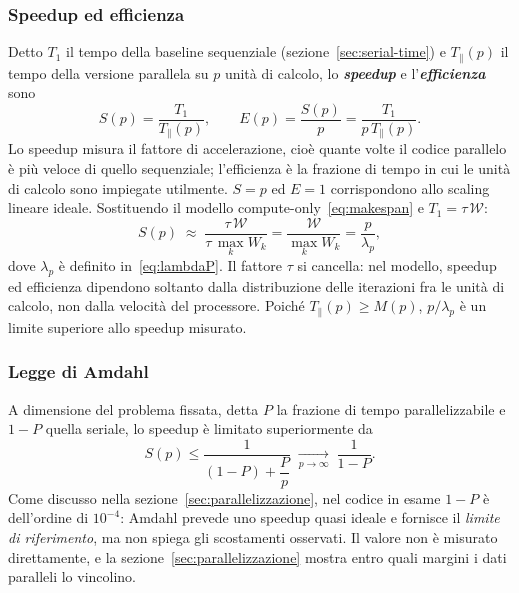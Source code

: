 \subsubsection{Speedup ed efficienza}
Detto $T_1$ il tempo della baseline sequenziale (sezione~\ref{sec:serial-time})
e $T_\parallel(p)$ il tempo della versione parallela su $p$ unità di calcolo, lo
\emph{\textbf{speedup}} e l'\emph{\textbf{efficienza}} sono
\begin{equation}
    S(p) = \frac{T_1}{T_\parallel(p)},
    \qquad
    E(p) = \frac{S(p)}{p} = \frac{T_1}{p\,T_\parallel(p)}.
    \label{eq:speedup-efficienza}
\end{equation}
Lo speedup misura il fattore di accelerazione, cioè quante volte il codice
parallelo è più veloce di quello sequenziale; l'efficienza è la frazione di
tempo in cui le unità di calcolo sono impiegate utilmente. $S = p$ ed $E = 1$
corrispondono allo scaling lineare ideale. Sostituendo il modello
compute-only~\eqref{eq:makespan} e $T_1 = \tau\,\mathcal{W}$:
%
\[
    S(p) \;\approx\; \frac{\tau\,\mathcal{W}}{\tau\,\max_k W_k}
    = \frac{\mathcal{W}}{\max_k W_k}
    = \frac{p}{\lambda_p},
\]
%
dove $\lambda_p$ è definito in~\eqref{eq:lambdaP}. Il fattore $\tau$ si
cancella: nel modello, speedup ed efficienza dipendono soltanto dalla
distribuzione delle iterazioni fra le unità di calcolo, non dalla velocità del
processore. Poiché $T_\parallel(p) \ge M(p)$, $p/\lambda_p$ è un limite
superiore allo speedup misurato.

\subsubsection{Legge di Amdahl}
A dimensione del problema fissata, detta $P$ la frazione di tempo
parallelizzabile e $1-P$ quella seriale, lo speedup è limitato superiormente da
\[
    S(p) \le \frac{1}{(1-P) + \dfrac{P}{p}}
    \;\xrightarrow[p\to\infty]{}\; \frac{1}{1-P}.
\]
Come discusso nella sezione~\ref{sec:parallelizzazione}, nel codice in esame
$1-P$ è dell'ordine di $10^{-4}$: Amdahl prevede uno speedup quasi ideale e
fornisce il \emph{limite di riferimento}, ma non spiega gli scostamenti
osservati. Il valore non è misurato direttamente, e la
sezione~\ref{sec:parallelizzazione} mostra entro quali margini i dati paralleli
lo vincolino.

